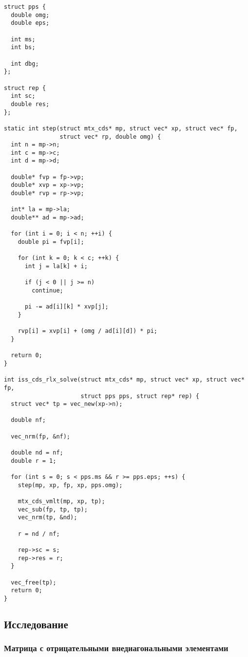 \documentclass[12pt, a4paper]{article}
\begin{document}
\begin{verbatim}
struct pps {
  double omg;
  double eps;

  int ms;
  int bs;

  int dbg;
};

struct rep {
  int sc;
  double res;
};

static int step(struct mtx_cds* mp, struct vec* xp, struct vec* fp,
                struct vec* rp, double omg) {
  int n = mp->n;
  int c = mp->c;
  int d = mp->d;

  double* fvp = fp->vp;
  double* xvp = xp->vp;
  double* rvp = rp->vp;

  int* la = mp->la;
  double** ad = mp->ad;

  for (int i = 0; i < n; ++i) {
    double pi = fvp[i];

    for (int k = 0; k < c; ++k) {
      int j = la[k] + i;

      if (j < 0 || j >= n)
        continue;

      pi -= ad[i][k] * xvp[j];
    }

    rvp[i] = xvp[i] + (omg / ad[i][d]) * pi;
  }

  return 0;
}

int iss_cds_rlx_solve(struct mtx_cds* mp, struct vec* xp, struct vec* fp,
                      struct pps pps, struct rep* rep) {
  struct vec* tp = vec_new(xp->n);

  double nf;

  vec_nrm(fp, &nf);

  double nd = nf;
  double r = 1;

  for (int s = 0; s < pps.ms && r >= pps.eps; ++s) {
    step(mp, xp, fp, xp, pps.omg);

    mtx_cds_vmlt(mp, xp, tp);
    vec_sub(fp, tp, tp);
    vec_nrm(tp, &nd);

    r = nd / nf;

    rep->sc = s;
    rep->res = r;
  }

  vec_free(tp);
  return 0;
}
\end{verbatim}

\subsection{Исследование}
\subsubsection{Матрица с отрицательными внедиагональными элементами}
\end{document}
